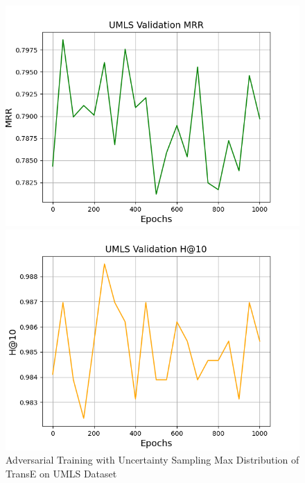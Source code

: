 \begin{figure}
\begin{minipage}{.5\textwidth}
      \includegraphics[width=0.9\linewidth]{figures/results/UMLS/AdversarialTraining/Uncertainty/Max_Distribution/gan_train_umls_mrr.png}
    \end{minipage}%
    \begin{minipage}{.5\textwidth}
      \centering
      \includegraphics[width=0.9\linewidth]{figures/results/UMLS/AdversarialTraining/Uncertainty/Max_Distribution/gan_train_umls_hit10.png}
    \end{minipage}%
    \caption{Adversarial Training with Uncertainty Sampling Max Distribution of TransE on UMLS Dataset}
    \label{fig:test}
\end{figure}

